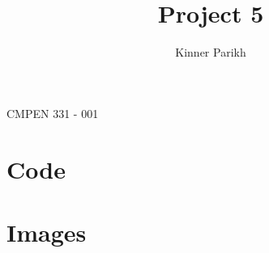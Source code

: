 \documentclass[11pt]{article}
\begin{document}
%
\author{Kinner Parikh}
\title{Project 5}
\maketitle
\begin{center}
    CMPEN 331 - 001
\end{center}

\newpage

\section{Code}


\ttfamily


\newpage

\ttfamily


\newpage

\ttfamily


\rmfamily
\section{Images}
\end{document}
